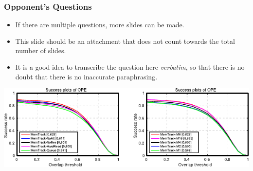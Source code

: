 



\appendix{}
\begin{frame}
  \frametitle{Opponent's Questions}
  \begin{itemize}
    \item If there are multiple questions, more slides can be made.
    \item This slide should be an attachment that does not count towards the total number of slides.
    \item It is a good idea to transcribe the question here \emph{verbatim}, so that there is no doubt that there is no inaccurate paraphrasing.
  \end{itemize}
  \bigskip
  \includegraphics[width=\textwidth]{img/template-ResultsPlot.pdf}
\end{frame}